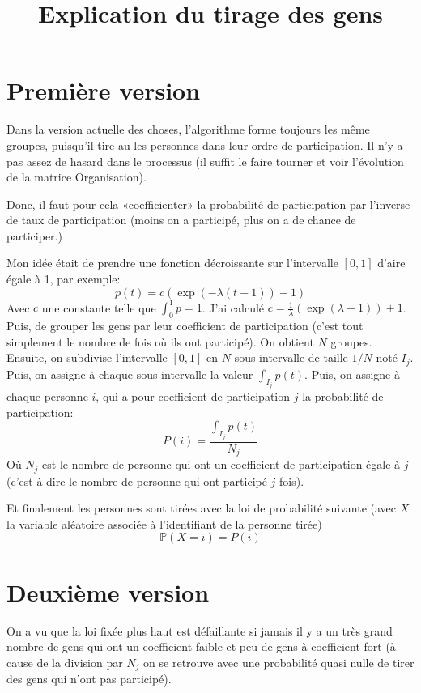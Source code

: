 \documentclass[11pt, a4paper]{article}
\title{Explication du tirage des gens}
\begin{document}

\maketitle

\section{Première version}
Dans la version actuelle des choses, l'algorithme forme toujours les même groupes, puisqu'il tire au
les personnes dans leur ordre de participation. Il n'y a pas assez de hasard dans le processus (il
suffit le faire tourner et voir l'évolution de la matrice Organisation).

Donc, il faut pour cela «coefficienter» la probabilité de participation par l'inverse de taux de
participation (moins on a participé, plus on a de chance de participer.)

Mon idée était de prendre une fonction décroissante sur l'intervalle $[0,1]$ d'aire égale à 1, par
exemple:
\[
    p(t) = c(\exp(-\lambda(t-1))-1)
    \]
Avec $c$ une constante telle que $\int_0^1 p = 1$. J'ai calculé $c = \frac{1}{\lambda}(\exp(\lambda
-1)) +1$.
Puis, de grouper les gens par leur coefficient de participation (c'est tout simplement le nombre de
fois où ils ont participé). On obtient $N$ groupes. Ensuite, on subdivise l'intervalle $[0, 1]$ en
$N$ sous-intervalle de taille $1/N$ noté $I_j$. Puis, on assigne à chaque sous intervalle la valeur
$\int_{I_j} p(t)$.
Puis, on assigne à chaque personne $i$, qui a pour coefficient de participation $j$ la probabilité de participation:
\[
    P(i)= \frac{\int_{I_j}p(t)}{N_j}
\]
Où $N_j$ est le nombre de personne qui ont un coefficient de participation égale à $j$ (c'est-à-dire
le nombre de personne qui ont participé $j$ fois).

Et finalement les personnes sont tirées avec la loi de probabilité suivante (avec $X$ la variable
aléatoire associée à l'identifiant de la personne tirée)
\[
    \mathbb{P}(X = i)= P(i)
\]

\newpage

\section{Deuxième version}

On a vu que la loi fixée plus haut est défaillante si jamais il y a un très grand nombre de gens qui
ont un coefficient faible et peu de gens à coefficient fort (à cause de la division par $N_j$ on se
retrouve avec une probabilité quasi nulle de tirer des gens qui n'ont pas participé).
\end{document}
